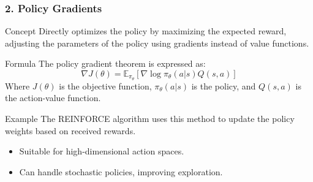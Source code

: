 \documentclass[aspectratio=169]{beamer}
\begin{document}
\begin{frame}[fragile]
    \frametitle{2. Policy Gradients}
    \begin{block}{Concept}
        Directly optimizes the policy by maximizing the expected reward, adjusting the parameters of the policy using gradients instead of value functions.
    \end{block}

    \begin{block}{Formula}
        The policy gradient theorem is expressed as:
        \begin{equation}
            \nabla J(\theta) = \mathbb{E}_{\pi_\theta} \left[ \nabla \log \pi_\theta(a|s) Q(s, a) \right]
        \end{equation}
        Where \( J(\theta) \) is the objective function, \( \pi_\theta(a|s) \) is the policy, and \( Q(s, a) \) is the action-value function.
    \end{block}

    \begin{block}{Example}
        The REINFORCE algorithm uses this method to update the policy weights based on received rewards.
    \end{block}

    \begin{itemize}
        \item Suitable for high-dimensional action spaces.
        \item Can handle stochastic policies, improving exploration.
    \end{itemize}
\end{frame}
\end{document}
